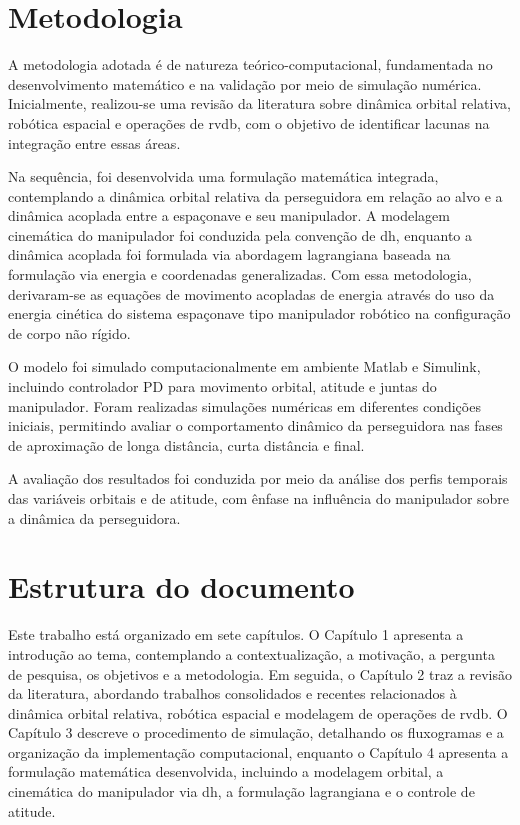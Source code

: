 \section{Metodologia}

A metodologia adotada é de natureza teórico-computacional, fundamentada no desenvolvimento matemático e na validação por meio de simulação numérica. Inicialmente, realizou-se uma revisão da literatura sobre dinâmica orbital relativa, robótica espacial e operações de \gls{rvdb}, com o objetivo de identificar lacunas na integração entre essas áreas.

Na sequência, foi desenvolvida uma formulação matemática integrada, contemplando a dinâmica orbital relativa da perseguidora em relação ao alvo e a dinâmica acoplada entre a espaçonave e seu manipulador.
A modelagem cinemática do manipulador foi conduzida pela convenção de \gls{dh}, enquanto a dinâmica acoplada foi formulada via abordagem lagrangiana baseada na formulação via energia e coordenadas generalizadas. Com essa metodologia, derivaram-se as equações de movimento acopladas de energia através do uso da energia cinética do sistema espaçonave tipo manipulador robótico na configuração de corpo não rígido.

O modelo foi simulado computacionalmente em ambiente Matlab e Simulink, incluindo controlador PD para movimento orbital, atitude e juntas do manipulador. Foram realizadas simulações numéricas em diferentes condições iniciais, permitindo avaliar o comportamento dinâmico da perseguidora nas fases de aproximação de longa distância, curta distância e final.

A avaliação dos resultados foi conduzida por meio da análise dos perfis temporais das variáveis orbitais e de atitude, com ênfase na influência do manipulador sobre a dinâmica da perseguidora.

\section{Estrutura do documento}

Este trabalho está organizado em sete capítulos.
O Capítulo 1 apresenta a introdução ao tema, contemplando a contextualização, a motivação, a pergunta de pesquisa, os objetivos e a metodologia.
Em seguida, o Capítulo 2 traz a revisão da literatura, abordando trabalhos consolidados e recentes relacionados à dinâmica orbital relativa, robótica espacial e modelagem de operações de \gls{rvdb}.
O Capítulo 3 descreve o procedimento de simulação, detalhando os fluxogramas e a organização da implementação computacional, enquanto o Capítulo 4 apresenta a formulação matemática desenvolvida, incluindo a modelagem orbital, a cinemática do manipulador via \gls{dh}, a formulação lagrangiana e o controle de atitude.

